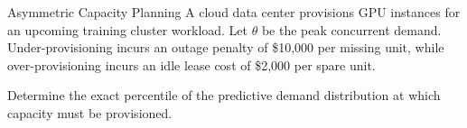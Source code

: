 \begin{ExerciseBox}{Asymmetric Capacity Planning}
  A cloud data center provisions GPU instances for an upcoming training cluster workload. Let \(\theta\) be the peak concurrent demand. Under-provisioning incurs an outage penalty of \$10,000 per missing unit, while over-provisioning incurs an idle lease cost of \$2,000 per spare unit.
  
  Determine the exact percentile of the predictive demand distribution at which capacity must be provisioned.
\end{ExerciseBox}
